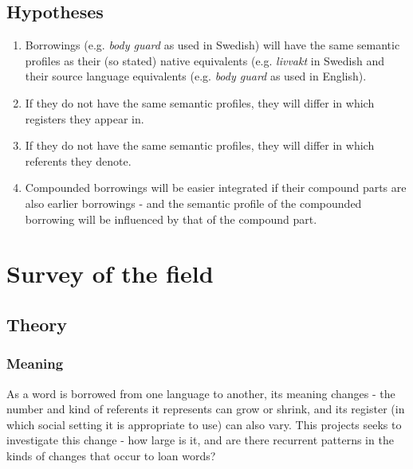 \documentclass[a4paper]{article}
\begin{document}
\subsection{Hypotheses}
\begin{enumerate}
	\item Borrowings (e.g. \emph{body guard} as used in Swedish) will have the same semantic profiles as their (so stated) native equivalents (e.g. \emph{livvakt} in Swedish and their source language equivalents (e.g. \emph{body guard} as used in English).
	\item If they do not have the same semantic profiles, they will differ in which registers they appear in.
	\item If they do not have the same semantic profiles, they will differ in which referents they denote.
	\item Compounded borrowings will be easier integrated if their compound parts are also earlier borrowings - and the semantic profile of the compounded borrowing will be influenced by that of the compound part.
	
\end{enumerate}



\section{Survey of the field}


\subsection{Theory}


\subsubsection{Meaning}
\label{sect_meaning}

As a word is borrowed from one language to another, its meaning changes - the number and kind of referents it represents can grow or shrink, and its register (in which social setting it is appropriate to use) can also vary. This projects seeks to investigate this change - how large is it, and are there recurrent patterns in the kinds of changes that occur to loan words?
\end{document}
